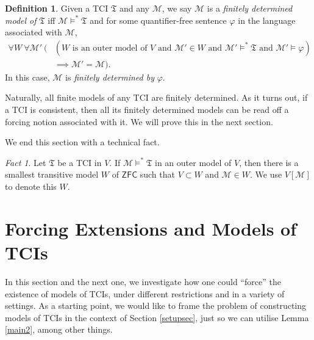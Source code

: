 \documentclass[12pt, twoside]{memoir}
\numberwithin{equation}{section}
\theoremstyle{definition}
\newtheorem{defi}[thm]{Definition}
\theoremstyle{remark}
\newtheorem{fact}[thm]{Fact}
\theoremstyle{definition}
\theoremstyle{definition}
\theoremstyle{definition}
\theoremstyle{remark}
\begin{document}
\begin{defi}
Given a TCI $\mathfrak{T}$ and any $\mathcal{M}$, we say $\mathcal{M}$ is a \emph{finitely determined model of} $\mathfrak{T}$ iff $\mathcal{M} \models^* \mathfrak{T}$ and for some quantifier-free sentence $\varphi$ in the language associated with $\mathcal{M}$, 
\begin{align*}
    \forall W \ \forall \mathcal{M}' \ (&(W \text{ is an outer model of } V \text{ and } \mathcal{M}' \in W \text{ and } \mathcal{M}' \models^* \mathfrak{T} \text{ and } \mathcal{M}' \models \varphi) \\ 
    & \implies \mathcal{M}' = \mathcal{M}).
\end{align*}
In this case, $\mathcal{M}$ is \emph{finitely determined by} $\varphi$.
\end{defi}

Naturally, all finite models of any TCI are finitely determined. As it turns out, if a TCI is consistent, then all its finitely determined models can be read off a forcing notion associated with it. We will prove this in the next section.

We end this section with a technical fact.

\begin{fact}
Let $\mathfrak{T}$ be a TCI in $V$. If $\mathcal{M} \models^* \mathfrak{T}$ in an outer model of $V$, then there is a smallest transitive model $W$ of $\mathsf{ZFC}$ such that $V \subset W$ and $\mathcal{M} \in W$. We use $V[\mathcal{M}]$ to denote this $W$.
\end{fact}

\section{Forcing Extensions and Models of TCIs}\label{GOCon}

In this section and the next one, we investigate how one could ``force'' the existence of models of TCIs, under different restrictions and in a variety of settings. As a starting point, we would like to frame the problem of constructing models of TCIs in the context of Section \ref{setupsec}, just so we can utilise Lemma \ref{main2}, among other things. 
\end{document}
